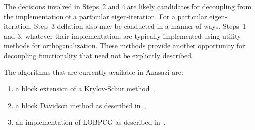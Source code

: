 \documentclass[acmtoms]{acmtrans2m}
\newcounter{algorithm}
\begin{document}
The decisions involved in Steps~2 and 4 are likely candidates for decoupling from the
implementation of a particular eigen-iteration. For a particular eigen-iteration, Step~3
deflation also may be conducted in a manner of ways. Steps~1 and 3, whatever their
implementation, are typically implemented using utility methods for orthogonalization.
These methods provide another opportunity for decoupling functionality that need not be
explicitly described.



The algorithms that are currently available in Anasazi are:
\begin{enumerate}
  \item a block extension of a Krylov-Schur method~\cite{stew:01},
  \item a block Davidson method as described in~\cite{Arbenz:2005:ACE},
  \item an implementation of LOBPCG as described in~\cite{Hetmaniuk:2006:BSL}.
\end{enumerate}


% 
\end{document}
